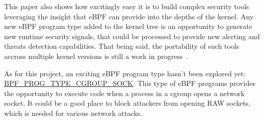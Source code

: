 This paper also shows how excitingly easy it is to build complex security tools leveraging the insight that eBPF can provide into the depths of the kernel. Any new eBPF program type added to the kernel tree is an opportunity to generate new runtime security signals, that could be processed to provide new alerting and threats detection capabilities. That being said, the portability of such tools accross multiple kernel versions is still a work in progress~\cite{ProcessLevelNetworkSecurityMonitoring:CORE}.

As for this project, an exciting eBPF program type hasn’t been explored yet: \url{BPF_PROG_TYPE_CGROUP_SOCK}. This type of eBPF programs provides the opportunity to execute code when a process in a cgroup opens a network socket. It could be a good place to block attackers from opening RAW sockets, which is needed for various network attacks.


\nocite{*}

